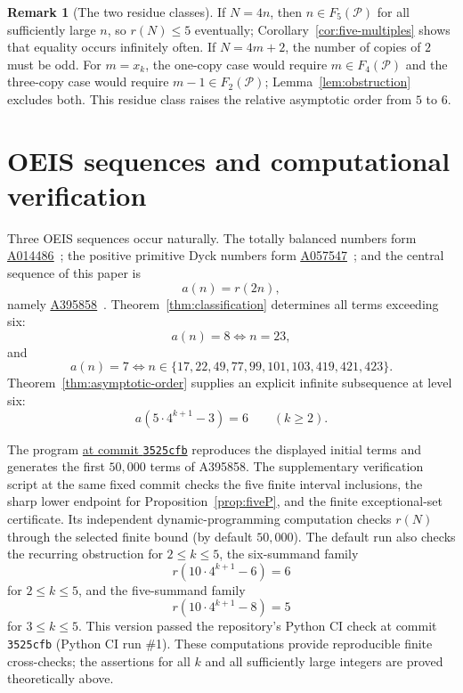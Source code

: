 \documentclass[12pt]{article}
\theoremstyle{plain}
\theoremstyle{definition}
\newtheorem{remark}[theorem]{Remark}
\theoremstyle{plain}
\newcommand{\Pset}{\mathcal{P}}
\newcommand{\seqnum}[1]{\href{https://oeis.org/#1}{\rm \underline{#1}}}
\begin{document}
\begin{remark}[The two residue classes]
If $N=4n$, then $n\in F_5(\Pset)$ for all sufficiently large $n$, so
$r(N)\leq5$ eventually; Corollary~\ref{cor:five-multiples} shows that equality
occurs infinitely often.  If $N=4m+2$, the number of copies of $2$ must be odd.
For $m=x_k$, the one-copy case would require $m\in F_4(\Pset)$ and the
three-copy case would require $m-1\in F_2(\Pset)$; Lemma~\ref{lem:obstruction}
excludes both.  This residue class raises the relative asymptotic order from
$5$ to $6$.
\end{remark}

\section{OEIS sequences and computational verification}
\label{sec:oeis}

Three OEIS sequences occur naturally.  The totally balanced numbers form
\seqnum{A014486}~\cite{OEIS-A014486}; the positive primitive Dyck numbers form
\seqnum{A057547}~\cite{OEIS-A057547}; and the central sequence of this paper is
\[
  a(n)=r(2n),
\]
namely \seqnum{A395858}~\cite{OEIS-A395858}.  Theorem~\ref{thm:classification}
determines all terms exceeding six:
\[
  a(n)=8\iff n=23,
\]
and
\[
  a(n)=7\iff
  n\in\{17,22,49,77,99,101,103,419,421,423\}.
\]
Theorem~\ref{thm:asymptotic-order} supplies an explicit infinite subsequence at
level six:
\begin{equation}\label{eq:A395858-six-subsequence}
  a(5\cdot4^{k+1}-3)=6\qquad(k\geq2).
\end{equation}

The program
\href{https://github.com/growupkuriyama-hub/lean_cfg_project/blob/3525cfb/LeanCfgProject/PrimDyck/A395858.py}{ at commit \texttt{3525cfb}}
reproduces the displayed initial terms and generates the first $50{,}000$ terms
of A395858.  The supplementary verification script at the same fixed commit
checks the five finite interval inclusions, the sharp lower endpoint for
Proposition~\ref{prop:fiveP}, and the finite exceptional-set certificate.  Its
independent dynamic-programming computation checks $r(N)$ through the selected
finite bound (by default $50{,}000$).  The default run also checks the recurring
obstruction for $2\leq k\leq5$, the six-summand family
\[
 r(10\cdot4^{k+1}-6)=6
\]
for $2\leq k\leq5$, and the five-summand family
\[
 r(10\cdot4^{k+1}-8)=5
\]
for $3\leq k\leq5$.  This version passed the repository's Python CI check at
commit \texttt{3525cfb} (Python CI run \#1).  These computations provide
reproducible finite cross-checks; the assertions for all $k$ and all sufficiently
large integers are proved theoretically above.
\end{document}
